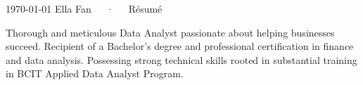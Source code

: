 \documentclass[11pt, a4paper]{awesome-cv}
\begin{document}
\makecvheader[C]

\makecvfooter
  {\today}
  {Ella Fan~~~·~~~Résumé}
  {\thepage}


% 
% 
% 
% 
% 



\begin{cvparagraph}

Thorough and meticulous Data Analyst passionate about helping businesses succeed.
Recipient of a Bachelor's degree and professional certification in finance and data analysis. 
Possessing strong technical skills rooted in substantial training in BCIT Applied Data Analyst Program.
\end{cvparagraph}


\end{document}
